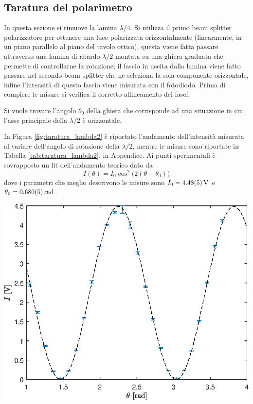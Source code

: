 \documentclass[10pt,oneside,a4paper]{article}
\newenvironment{Figure}
  {\par\medskip\noindent\minipage{\linewidth}}
  {\endminipage\par\medskip}
\begin{document}
\begin{multicols}{2}
\section{Taratura del polarimetro}\label{sec:taratura}
In questa sezione si rimuove la lamina $\lambda / 4$. Si utilizza il primo beam splitter polarizzatore per ottenere una luce polarizzata orizzontalmente (linearmente, in un piano parallelo al piano del tavolo ottico), questa viene fatta passare attraverso una lamina di ritardo $\lambda/2$ montata su una ghiera graduata che permette di controllarne la rotazione; il fascio in uscita dalla lamina viene fatto passare nel secondo beam splitter che ne seleziona la sola componente orizzontale, infine l'intensità di questo fascio viene misurata con il fotodiodo. Prima di compiere le misure si verifica il corretto allineamento dei fasci. 

Si vuole trovare l'angolo $\theta_0$ della ghiera che corrisponde ad una situazione in cui l'asse principale della $\lambda/2$ è orizzontale.

In Figura \ref{fig:taratura_lambda2} è riportato l'andamento dell'intensità misurata al variare dell'angolo di rotazione della $\lambda/2$, mentre le misure sono riportate in Tabella \ref{tab:taratura_lambda2}, in Appendice. Ai punti sperimentali è sovrapposto un fit dell'andamento teorico dato da
\begin{equation}
	I(\theta) = I_0 \cos^2\big( 2(\theta- \theta_0)\big)
\end{equation}
dove i parametri che meglio descrivono le misure sono $I_0 = \SI{4.48 \pm 0.05}{V}$ e ${\theta_0 = \SI{0.680\pm0.005}{rad}}$.
\begin{Figure}
	\begin{center}
	\includegraphics[width=\linewidth]{taratura_lambda2.eps}
	\label{fig:taratura_lambda2}
	\end{center}
\end{Figure}


\end{multicols}
\end{document}

